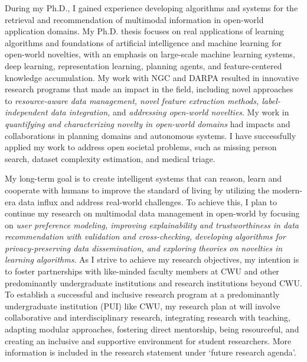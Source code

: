 \documentclass[10pt]{article}
\renewcommand*\paragraph[1]{}
\begin{document}
\paragraph{1 and P1) Earned doctoral degree in computer science or a closely related field}
During my Ph.D., I gained experience developing algorithms and systems for the retrieval and recommendation of multimodal information in open-world application domains. My Ph.D. thesis focuses on real applications of learning algorithms and foundations of artificial intelligence and machine learning for open-world novelties, with an emphasis on large-scale machine learning systems, deep learning, representation learning, planning agents, and feature-centered knowledge accumulation. My work with NGC and DARPA resulted in innovative research programs that made an impact in the field, including novel approaches to \textit{resource-aware data management, novel feature extraction methods, label-independent data integration,} and \textit{addressing open-world novelties}. My work in \textit{quantifying and characterizing novelty in open-world domains} had impacts and collaborations in planning domains and autonomous systems. I have successfully applied my work to address open societal problems, such as missing person search, dataset complexity estimation, and medical triage.

My long-term goal is to create intelligent systems that can reason, learn and cooperate with humans to improve the standard of living by utilizing the 
modern-era data influx
and address real-world challenges.
To achieve this, I plan to continue my research on multimodal data management in open-world by focusing on \textit{user preference modeling, improving explainability and trustworthiness in data recommendation with validation and cross-checking, developing algorithms for privacy-preserving data dissemination, and exploring theories on novelties in learning algorithms}. 
As I strive to achieve my research objectives, my intention is to foster partnerships with like-minded faculty members at CWU and other predominantly undergraduate institutions and research institutions beyond CWU.
%
To establish a successful and inclusive research program at a predominantly undergraduate institution (PUI) like
CWU, my research plan at \shortInstitutionName{}
will involve collaborative and interdisciplinary research, integrating research with teaching, adapting modular approaches, fostering direct mentorship, being resourceful, and creating an inclusive and supportive environment for student researchers. More information is included in the research statement under `future research agenda'.
%
\end{document}
